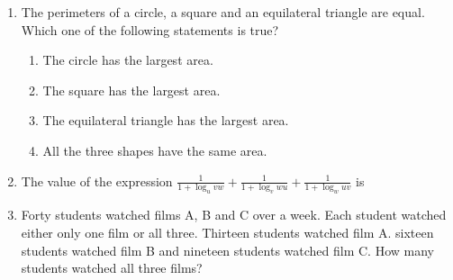 \documentclass[journal,12pt,onecolumn]{IEEEtran}
\theoremstyle{remark}
\begin{document}
\begin{enumerate}
    \begin{enumerate}
    \end{enumerate}

    \item The perimeters of a circle, a square and an equilateral triangle are equal. Which one of the following statements is true?
    \hfill{}

    \begin{enumerate}
        \item The circle has the largest area.
        \item The square has the largest area.
        \item The equilateral triangle has the largest area.
        \item All the three shapes have the same area.
    \end{enumerate}

    \item The value of the expression $\frac{1}{1+\log_{u}{vw}} + \frac{1}{1+\log_{v}{wu}} + \frac{1}{1+\log_{w}{uv}}$ is
    \hfill{}

    \begin{enumerate}
    \end{enumerate}

    \item Forty students watched films A, B and C over a week. Each student watched either only one film or all three. Thirteen students watched film A. sixteen students watched film B and nineteen students watched film C. How many students watched all three films?
    \hfill{}

    \begin{enumerate}
    \end{enumerate}


\end{enumerate}
\end{document}

